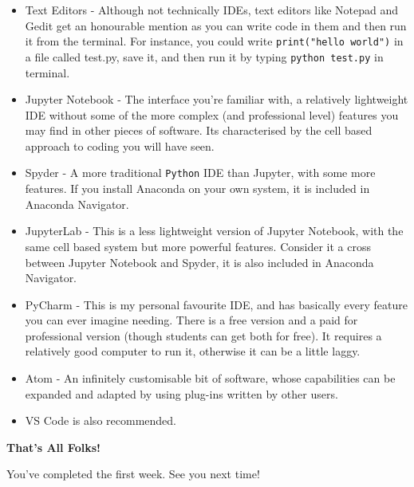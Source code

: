 \begin{tcolorbox}[colback=red!5!white,colframe=red!75!black]
\begin{itemize}
    \item Text Editors - Although not technically IDEs, text editors like Notepad and Gedit get an honourable mention as you can write code in them and then run it from the terminal. For instance, you could write \texttt{print("hello world")} in a file called test.py, save it, and then run it by typing \texttt{python test.py} in terminal.
    \item Jupyter Notebook - The interface you're familiar with, a relatively lightweight IDE without some of the more complex (and professional level) features you may find in other pieces of software. Its characterised by the cell based approach to coding you will have seen.
    \item Spyder - A more traditional \texttt{Python} IDE than Jupyter, with some more features. If you install Anaconda on your own system, it is included in Anaconda Navigator.
    \item JupyterLab - This is a less lightweight version of Jupyter Notebook, with the same cell based system but more powerful features. Consider it a cross between Jupyter Notebook and Spyder, it is also included in Anaconda Navigator.
    \item PyCharm - This is my personal favourite IDE, and has basically every feature you can ever imagine needing. There is a free version and a paid for professional version (though students can get both for free). It requires a relatively good computer to run it, otherwise it can be a little laggy.
    \item Atom - An infinitely customisable bit of software, whose capabilities can be expanded and adapted by using plug-ins written by other users. 
    \item VS Code is also recommended.
\end{itemize}

\end{tcolorbox}
\hspace{0pt}
\vspace{70mm}
\begin{center}
\Huge{{\bf That's All Folks!}}

\huge{You've completed the first week. See you next time!}
\end{center}
